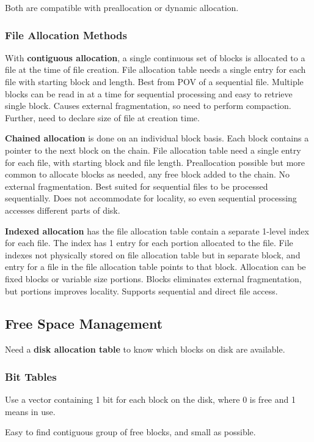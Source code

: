 \documentclass[11pt]{article}
\begin{document}
Both are compatible with preallocation or dynamic allocation.
\subsubsection{File Allocation Methods}
\label{sec:orgc18eb24}
With \textbf{contiguous allocation}, a single continuous set of blocks is allocated to a file at the time
of file creation.
File allocation table needs a single entry for each file with starting block and length.
Best from POV of a sequential file.
Multiple blocks can be read in at a time for sequential processing and easy to retrieve single
block.
Causes external fragmentation, so need to perform compaction. Further, need to declare size of
file at creation time.

\textbf{Chained allocation} is done on an individual block basis.
Each block contains a pointer to the next block on the chain.
File allocation table need a single entry for each file, with starting block and file length.
Preallocation possible but more common to allocate blocks as needed, any free block added to the
chain.
No external fragmentation.
Best suited for sequential files to be processed sequentially.
Does not accommodate for locality, so even sequential processing accesses different parts of
disk.

\textbf{Indexed allocation} has the file allocation table contain a separate 1-level index for each file.
The index has 1 entry for each portion allocated to the file.
File indexes not physically stored on file allocation table but in separate block, and entry for a
file in the file allocation table points to that block.
Allocation can be fixed blocks or variable size portions.
Blocks eliminates external fragmentation, but portions improves locality.
Supports sequential and direct file access.
\subsection{Free Space Management}
\label{sec:orgeb0928c}
Need a \textbf{disk allocation table} to know which blocks on disk are available.
\subsubsection{Bit Tables}
\label{sec:org77c7c25}
Use a vector containing 1 bit for each block on the disk, where 0 is free and 1 means in use.

Easy to find contiguous group of free blocks, and small as possible.
\end{document}
